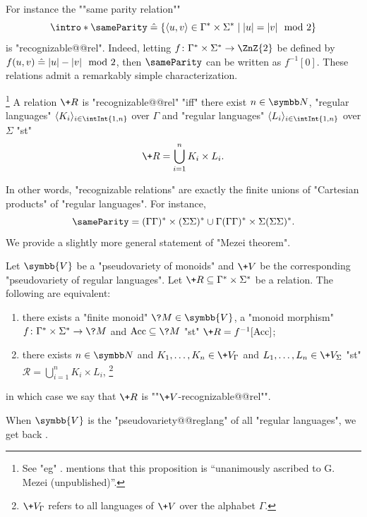 For instance the \AP""same parity relation""
\[
	{\intro*\sameParity} \defeq 
	\{
		\tup{u,v} \in \Gamma^* \times \Sigma^* \mid
		|u| = |v| \mod{2}
	\}
\]
is "recognizable@@rel". Indeed, letting $f\colon  \Gamma^* \times \Sigma^* \to \ZnZ{2}$
be defined by $f(u,v) \mathrel{\hat{=}} |u| - |v| \mod{2}$,
then $\sameParity$ can be written as $f^{-1}[0]$.
These relations admit a remarkably simple characterization.\AP
\begin{proposition}
	\!\footnote{See "eg" \cite[Corollary~II.2.20, p.~254]{Sakarovitch2009Elements}.
	\cite[\S~2, ``Notes \& references'']{Sakarovitch2009Elements} mentions
	that this proposition is ``unanimously ascribed to G. Mezei (unpublished)''.}
	\label{prop:Mezei-theorem}
	A relation $\+R$ is "recognizable@@rel" "iff" there exist $n\in\N$,
	"regular languages" $\tup{K_i}_{i\in \intInt{1,n}}$ over $\Gamma$
	and "regular languages" $\tup{L_i}_{i\in \intInt{1,n}}$ over $\Sigma$
	"st"
	\[
		\+R = \bigcup_{i=1}^n K_i \times L_i.
	\]
\end{proposition}

In other words, "recognizable relations" are exactly the finite unions of
"Cartesian products" of "regular languages".
For instance, \[{\sameParity} =
(\Gamma\Gamma)^* \times (\Sigma\Sigma)^*
\cup \Gamma(\Gamma\Gamma)^* \times \Sigma(\Sigma\Sigma)^*.\]
We provide a slightly more general statement of "Mezei theorem".

\begin{proposition}
	\label{prop:Mezei-theorem-generalization}
	Let $\symbb{V}$ be a "pseudovariety of monoids"
	and $\+V$ be the corresponding "pseudovariety of regular languages".
	Let $\+R \subseteq \Gamma^* \times \Sigma^*$ be a relation.
	The following are equivalent:
	\begin{enumerate}
		\item there exists a "finite monoid" $\?M \in \symbb{V}$, a "monoid morphism"
		$f\colon \Gamma^* \times \Sigma^* \to \?M$ and $\Acc \subseteq \?M$
		"st" $\+R = f^{-1}[\Acc]$;
		\item there exists $n \in \N$
		and $K_1,\dotsc,K_n \in \+V_{\Gamma}$ and $L_1,\dotsc,L_n \in \+V_{\Sigma}$
		"st" $\mathcal{R} = \bigcup_{i=1}^n K_i \times L_i$,%
		\footnote{$\+V_{\Gamma}$ refers to all languages of $\+V$ over the alphabet $\Gamma$.}
	\end{enumerate}
	in which case we say that $\+R$ is \AP""$\+V$-recognizable@@rel"".
\end{proposition}

When $\symbb{V}$ is the "pseudovariety@@reglang" of all "regular languages",
we get back .

